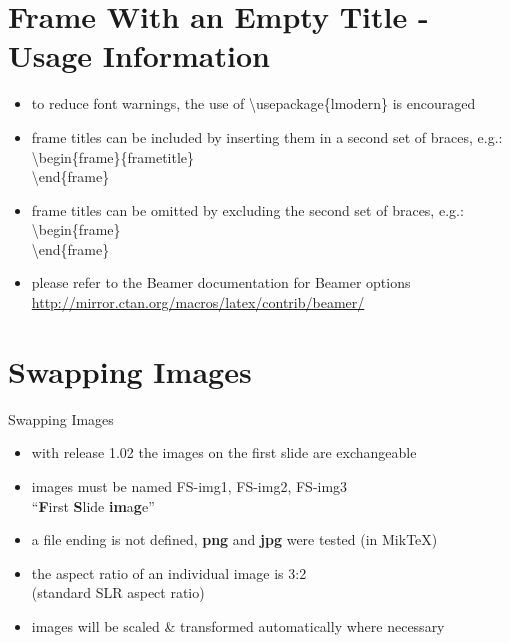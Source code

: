 \documentclass[aspectratio=43,display]{beamer}
\begin{document}
\section[Usage Information]{Frame With an Empty Title - Usage Information}
\begin{frame}[<1->]
	
	\begin{itemize}
	
		\item to reduce font warnings, the use of \textbackslash usepackage\{lmodern\} is encouraged
	
		\item frame titles can be included by inserting them in a second set of braces, e.g.: \\
		\textbackslash begin\{frame\}\{frametitle\} \\
		\textbackslash end\{frame\}
		
		\item frame titles can be omitted by excluding the second set of braces, e.g.: \\
		\textbackslash begin\{frame\} \\
		\textbackslash end\{frame\}
		
		\item please refer to the Beamer documentation for Beamer options \\
		\footnotesize
		\url{http://mirror.ctan.org/macros/latex/contrib/beamer/}
	\end{itemize}
	
\end{frame}

\section{Swapping Images}
\begin{frame}[<1->]{Swapping Images}
	
	\begin{itemize}
		\item with release 1.02 the images on the first slide are exchangeable
		
		\item images must be named FS-img1, FS-img2, FS-img3 \\
		``\textbf{F}irst \textbf{S}lide \textbf{im}a\textbf{g}e''
		
		\item a file ending is not defined, \textbf{png} and \textbf{jpg} were tested (in MikTeX)
		
		\item the aspect ratio of an individual image is 3:2 \\
		(standard SLR aspect ratio)
		
		\item images will be scaled \& transformed automatically where necessary
	\end{itemize}
	
\end{frame}
\end{document}
